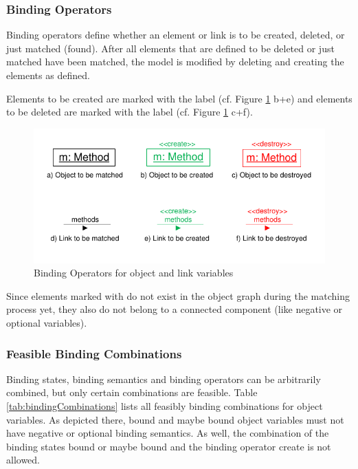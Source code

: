 \subsubsection{Binding Operators}
\label{sec:StoryPatterns:binding:operators}
Binding operators define whether an element or link is to be created, deleted,
or just matched (found).
After all elements that are defined to be deleted or just matched have been
matched, the model is modified by deleting and creating the elements as
defined.

Elements to be created are marked with the
label \create (cf. Figure \ref{fig:bindingOperatorsOverview} b+e) and elements
to be deleted are marked with the label \destroy (cf. Figure
\ref{fig:bindingOperatorsOverview} c+f).

\begin{figure}[htbp]
  \centering
  \includegraphics[scale=1.2]{figures/BindingOperatorsOverview}
  \caption{Binding Operators for object and link variables}
  \label{fig:bindingOperatorsOverview}
\end{figure}

Since elements marked with \create do not exist in the object graph during the
matching process yet, they also do not belong to a connected component (like
negative or optional variables).

\subsubsection{Feasible Binding Combinations}

Binding states, binding semantics and binding operators can be
arbitrarily combined, but only certain combinations are feasible. 
Table \ref{tab:bindingCombinations} lists all feasibly binding combinations for
object variables. As depicted there, bound and maybe bound object variables must not have negative
or optional binding semantics. As well, the combination of the binding states
bound or maybe bound and the binding operator create is not allowed.

